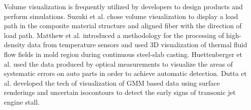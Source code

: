 \documentclass[a4paper,fleqn]{cas-dc}
\begin{document}
Volume visualization is frequently utilized by developers to design products and perform simulations.
Suzuki et al. \cite{Suzuki2020} chose volume visualization to display a load path in the composite material structure and aligned fiber with the direction of load path.
Matthew et al. \cite{Zappulla2019} introduced a methodology for the processing of high-density data from temperature sensors and used 3D visualization of thermal fluid flow fields in mold region during continuous steel-slab casting.
Huettenberger et al. \cite{Huettenberger2015} used the data produced by optical measurements to visualize the areas of systematic errors on auto parts in order to achieve automatic detection.
Dutta et al. \cite{dutta2016situ} developed the tech of visualization of GMM based data using surface renderings and uncertain isocontours to detect the early signs of transonic jet engine stall.
\end{document}
